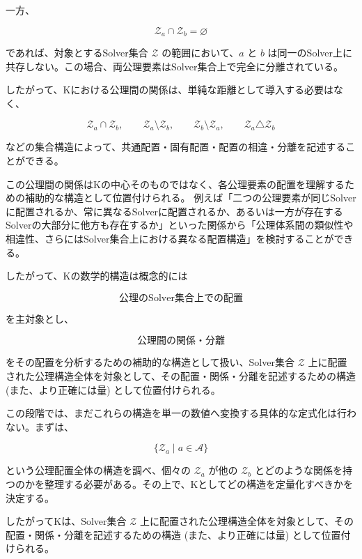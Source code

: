 一方、

\[
\mathcal{Z}_a\cap\mathcal{Z}_b=\varnothing
\]

であれば、対象とするSolver集合 $\mathcal{Z}$ の範囲において、$a$ と $b$ は同一のSolver上に共存しない。この場合、両公理要素はSolver集合上で完全に分離されている。

したがって、Kにおける公理間の関係は、単純な距離として導入する必要はなく、

\[
\mathcal{Z}_a\cap\mathcal{Z}_b,
\qquad
\mathcal{Z}_a\setminus\mathcal{Z}_b,
\qquad
\mathcal{Z}_b\setminus\mathcal{Z}_a,
\qquad
\mathcal{Z}_a\triangle\mathcal{Z}_b
\]

などの集合構造によって、共通配置・固有配置・配置の相違・分離を記述することができる。

この公理間の関係はKの中心そのものではなく、各公理要素の配置を理解するための補助的な構造として位置付けられる。
例えば「二つの公理要素が同じSolverに配置されるか、常に異なるSolverに配置されるか、あるいは一方が存在するSolverの大部分に他方も存在するか」といった関係から「公理体系間の類似性や相違性、さらにはSolver集合上における異なる配置構造」を検討することができる。

したがって、Kの数学的構造は概念的には

\[
\boxed{
\text{公理のSolver集合上での配置}
}
\]

を主対象とし、

\[
\boxed{
\text{公理間の関係・分離}
}
\]

をその配置を分析するための補助的な構造として扱い、Solver集合 $\mathcal{Z}$ 上に配置された公理構造全体を対象として、その配置・関係・分離を記述するための構造 (また、より正確には量) として位置付けられる。

この段階では、まだこれらの構造を単一の数値へ変換する具体的な定式化は行わない。まずは、

\[
\{\mathcal{Z}_a\mid a\in\mathcal{A}\}
\]

という公理配置全体の構造を調べ、個々の $\mathcal{Z}_a$ が他の $\mathcal{Z}_b$ とどのような関係を持つのかを整理する必要がある。その上で、Kとしてどの構造を定量化すべきかを決定する。

したがってKは、Solver集合 $\mathcal{Z}$ 上に配置された公理構造全体を対象として、その配置・関係・分離を記述するための構造 (また、より正確には量) として位置付けられる。